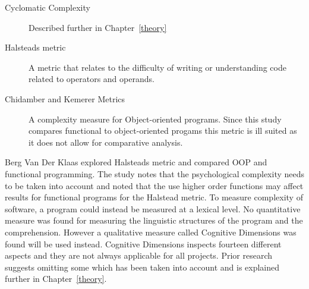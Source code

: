 \begin{description}

    \item [Cyclomatic Complexity] Described further in Chapter~\ref{theory}

    \item [Halsteads metric] A metric that relates to the difficulty of writing
    or understanding code related to operators and operands.~\cite{bergklaas}

    \item [Chidamber and Kemerer Metrics~\cite{chidamber}] A complexity measure
    for Object-oriented programs. Since this study compares functional to
    object-oriented progams this metric is ill suited as it does not allow for
    comparative analysis.

\end{description}

Berg Van Der Klaas explored Halsteads metric and compared OOP and functional
programming. The study notes that the psychological complexity needs to be taken
into account and noted that the use higher order functions may affect results
for functional programs for the Halstead metric. To measure complexity of
software, a program could instead be measured at a lexical level. No
quantitative measure was found for measuring the linguistic structures of the
program and the comprehension. However a qualitative measure called Cognitive
Dimensions was found will be used instead.  Cognitive Dimensions inspects
fourteen different aspects and they are not always applicable for all projects.
Prior research suggests omitting some which has been taken into account and is
explained further in Chapter~\ref{theory}.~\cite{euguenkiss}

